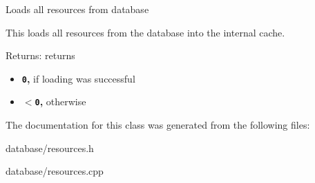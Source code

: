 Loads all resources from database

This loads all resources from the database into the internal cache.

\begin{Desc}
\item[Returns:]returns\begin{itemize}
\item {\bf {\tt 0},} if loading was successful\item {\bf {\tt $<$0},} otherwise \end{itemize}
\end{Desc}


The documentation for this class was generated from the following files:\begin{CompactItemize}
\item 
database/resources.h\item 
database/resources.cpp\end{CompactItemize}
